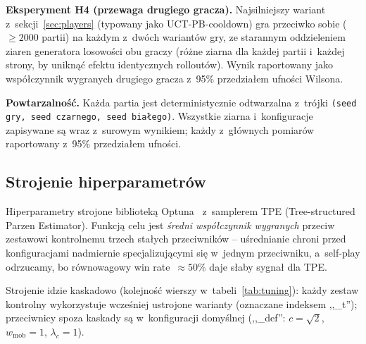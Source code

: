 \documentclass[11pt,a4paper]{article}
\begin{document}
\textbf{Eksperyment H4 (przewaga drugiego gracza).} Najsilniejszy wariant z~sekcji~\ref{sec:players} (typowany jako UCT-PB-cooldown) gra przeciwko sobie ($\geq 2000$ partii) na każdym z~dwóch wariantów gry, ze starannym oddzieleniem ziaren generatora losowości obu graczy (różne ziarna dla każdej partii i~każdej strony, by uniknąć efektu identycznych rolloutów). Wynik raportowany jako współczynnik wygranych drugiego gracza z~95\% przedziałem ufności Wilsona.

\textbf{Powtarzalność.} Każda partia jest deterministycznie odtwarzalna z~trójki \texttt{(seed gry, seed czarnego, seed białego)}. Wszystkie ziarna i~konfiguracje zapisywane są wraz z~surowym wynikiem; każdy z~głównych pomiarów raportowany z~95\% przedziałem ufności.

\subsection{Strojenie hiperparametrów}\label{sec:tuning}

Hiperparametry strojone biblioteką Optuna~\cite{akiba2019optuna} z~samplerem TPE (Tree-structured Parzen Estimator). Funkcją celu jest \emph{średni współczynnik wygranych} przeciw zestawowi kontrolnemu trzech stałych przeciwników -- uśrednianie chroni przed konfiguracjami nadmiernie specjalizującymi się w~jednym przeciwniku, a~self-play odrzucamy, bo równowagowy win rate~$\approx 50\%$ daje słaby sygnał dla TPE.

Strojenie idzie kaskadowo (kolejność wierszy w~tabeli~\ref{tab:tuning}): każdy zestaw kontrolny wykorzystuje wcześniej ustrojone warianty (oznaczane indeksem ,,\_t''); przeciwnicy spoza kaskady są w~konfiguracji domyślnej (,,\_def'': $c{=}\sqrt 2$, $w_{\text{mob}}{=}1$, $\lambda_c{=}1$).

\newcommand{\opp}{{\scriptsize\textbullet}~}
\newcommand{\opps}[3]{\opp #1\newline\opp #2\newline\opp #3}
\newcommand{\hpA}[1]{#1}
\newcommand{\hpB}[2]{#1\newline#2}
\end{document}
